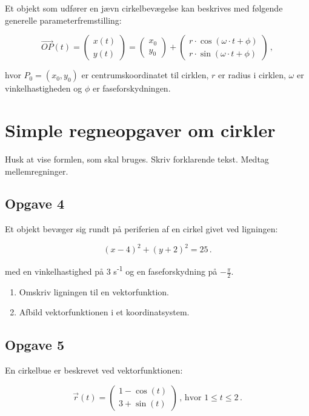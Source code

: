 \documentclass[a4paper, 12pt]{article}
\begin{document}
Et objekt som udfører en jævn cirkelbevægelse kan beskrives med følgende generelle parameterfremstilling:

$$\overrightarrow{OP}(t) = \begin{pmatrix} x(t) \\ y(t) \end{pmatrix} = \begin{pmatrix} x_0 \\ y_0 \end{pmatrix} + \begin{pmatrix} r \cdot \cos \left( \omega \cdot t + \phi \right) \\ r \cdot \sin \left(\omega \cdot t + \phi \right) \end{pmatrix} \,,$$

hvor \(P_0 = (x_0, y_0)\) er centrumskoordinatet til cirklen, \(r\) er radius i cirklen, \(\omega\) er vinkelhastigheden og \(\phi\) er faseforskydningen.

\newpage
\section*{Simple regneopgaver om cirkler}
\label{sec:org7ac7c25}

Husk at vise formlen, som skal bruges. Skriv forklarende tekst. Medtag mellemregninger.
\subsection*{Opgave 4}
\label{sec:orgdf15e8d}

Et objekt bevæger sig rundt på periferien af en cirkel givet ved ligningen:

$$(x-4)^2 + (y+2)^2 = 25\,.$$

med en vinkelhastighed på 3 s\textsuperscript{-1} og en faseforskydning på \(- \frac{\pi}{2}\).

\begin{enumerate}
\item Omskriv ligningen til en vektorfunktion.
\item Afbild vektorfunktionen i et koordinatsystem.
\end{enumerate}
\subsection*{Opgave 5}
\label{sec:org6cd146b}

En cirkelbue er beskrevet ved vektorfunktionen:

$$\vec{r} (t) = \begin{pmatrix} 1 - \cos(t) \\ 3 + \sin(t) \end{pmatrix} \, , \, \text{hvor } 1 \leq t \leq 2 \,.$$
\end{document}

